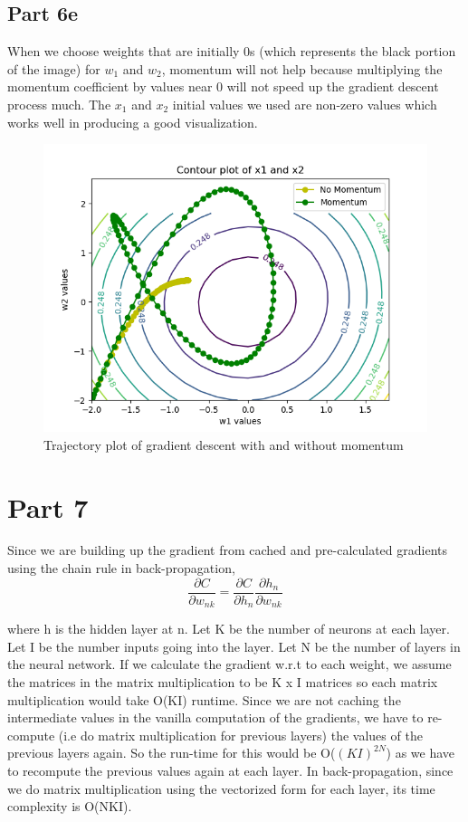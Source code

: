 \documentclass[10pt,letterpaper]{article}
\begin{document}
	\subsection*{Part 6e}
	When we choose weights that are initially 0s (which represents the black portion of the image) for $w_1$ and $w_2$, momentum will not help because multiplying the momentum coefficient by values near 0 will not speed up the gradient descent process much. The $x_1$ and $x_2$ initial values we used are non-zero values which works well in producing a good visualization.
	\begin{figure}[H]
		\centering
		\includegraphics[width=\linewidth]{part6_contour_plot_with_trajectory}
		\caption{Trajectory plot of gradient descent with and without momentum}
		\label{fig:part6contourplotwithtrajectory}
	\end{figure}

	\section{Part 7}
	Since we are building up the gradient from cached and pre-calculated gradients using the chain rule in back-propagation,
	\[   \frac{\partial C}{\partial w_{nk}} = \frac{\partial C}{\partial h_{n}} \frac{\partial h_{n}}{\partial w_{nk}}  \]

	where h is the hidden layer at n.
	Let K be the number of neurons at each layer. Let I be the number inputs going into the layer.
	Let N be the number of layers in the neural network. If we calculate the gradient w.r.t to each weight, we assume the matrices in the matrix multiplication to be K x I matrices so each matrix multiplication would take O(KI) runtime. Since we are not caching the intermediate values in the vanilla computation of the gradients, we have to re-compute (i.e do matrix multiplication for previous layers) the values of the previous layers again. So the run-time for this would be O($(KI)^{2N}$) as we have to recompute the previous values again at each layer. In back-propagation, since we do matrix multiplication using the vectorized form for each layer, its time complexity is O(NKI).
\end{document}

